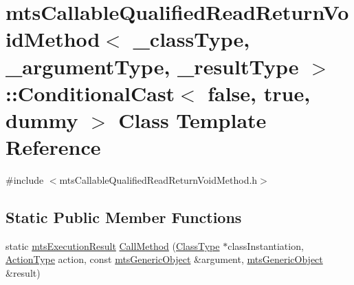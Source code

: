 \hypertarget{classmts_callable_qualified_read_return_void_method_1_1_conditional_cast_3_01false_00_01true_00_01dummy_01_4}{\section{mts\-Callable\-Qualified\-Read\-Return\-Void\-Method$<$ \-\_\-class\-Type, \-\_\-argument\-Type, \-\_\-result\-Type $>$\-:\-:Conditional\-Cast$<$ false, true, dummy $>$ Class Template Reference}
\label{classmts_callable_qualified_read_return_void_method_1_1_conditional_cast_3_01false_00_01true_00_01dummy_01_4}
}


{\ttfamily \#include $<$mts\-Callable\-Qualified\-Read\-Return\-Void\-Method.\-h$>$}

\subsection*{Static Public Member Functions}
\begin{DoxyCompactItemize}
\item 
static \hyperlink{classmts_execution_result}{mts\-Execution\-Result} \hyperlink{classmts_callable_qualified_read_return_void_method_1_1_conditional_cast_3_01false_00_01true_00_01dummy_01_4_ad8466b711cfeab24a216037d6cb096ab}{Call\-Method} (\hyperlink{classmts_callable_qualified_read_return_void_method_ae99cfab8208eb374f2cdf01c97edfa3b}{Class\-Type} $\ast$class\-Instantiation, \hyperlink{classmts_callable_qualified_read_return_void_method_a7ac7450d5dce9ad80db720a370118211}{Action\-Type} action, const \hyperlink{classmts_generic_object}{mts\-Generic\-Object} \&argument, \hyperlink{classmts_generic_object}{mts\-Generic\-Object} \&result)
\end{DoxyCompactItemize}



